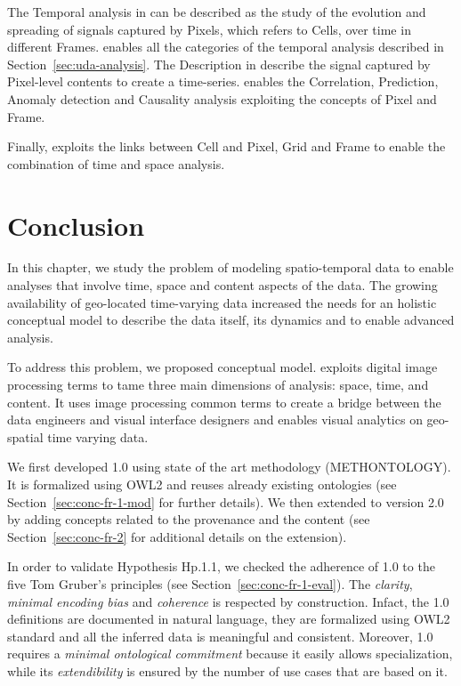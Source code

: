 The Temporal analysis in \frappe{} can be described as the study of the evolution and spreading of signals captured by \textsf{Pixel}s, which refers to \textsf{Cell}s, over time in different \textsf{Frame}s.
\frappe{} enables all the categories of the temporal analysis described in Section~\ref{sec:uda-analysis}.
The \textsf{Description} in \frappe{} describe the signal \textsf{captured} by \textsf{Pixel}-level contents to create a time-series. \frappe{} enables the \textsf{Correlation}, \textsf{Prediction}, \textsf{Anomaly detection} and \textsf{Causality} analysis exploiting the concepts of \textsf{Pixel} and \textsf{Frame}. 

Finally, \frappe{} exploits the links between \textsf{Cell} and \textsf{Pixel}, \textsf{Grid} and \textsf{Frame} to enable the combination of time and space analysis. 

\section{Conclusion}
In this chapter, we study the problem of modeling spatio-temporal data to enable analyses that involve time, space and content aspects of the data. 
The growing availability of geo-located time-varying data increased the needs for an holistic conceptual model to describe the data itself, its dynamics and to enable advanced analysis.

To address this problem, we proposed \frappe{} conceptual model. 
\frappe{} exploits digital image processing terms to tame three main dimensions of analysis: space, time, and content.
It uses image processing common terms to create a bridge between the data engineers and visual interface designers and enables visual analytics on geo-spatial time varying data.

We first developed \frappe{} 1.0 using state of the art methodology (METHONTOLOGY).
It is formalized using OWL2 and reuses already existing ontologies (see Section~\ref{sec:conc-fr-1-mod} for further details).
We then extended \frappe{} to version 2.0 by adding concepts related to the provenance and the content (see Section~\ref{sec:conc-fr-2} for additional details on the extension).

In order to validate Hypothesis \textsf{Hp.1.1}, we checked the adherence of \frappe{} 1.0 to the five Tom Gruber's principles (see Section~\ref{sec:conc-fr-1-eval}).
The \textit{clarity}, \textit{minimal encoding bias} and \textit{coherence} is respected by construction. 
Infact, the \frappe{} 1.0 definitions are documented in natural language, they are formalized using OWL2 standard and all the inferred data is meaningful and consistent.  
Moreover, \frappe{} 1.0 requires a \textit{minimal ontological commitment} because it easily allows specialization, while its \textit{extendibility} is ensured by the number of use cases that are based on it.

